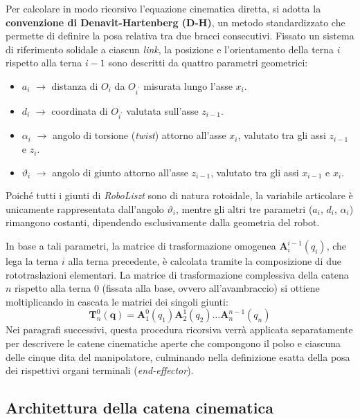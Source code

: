 Per calcolare in modo ricorsivo l'equazione cinematica diretta, si adotta la \textbf{convenzione di Denavit-Hartenberg (D-H)}, un metodo standardizzato che permette di definire la posa relativa tra due bracci consecutivi. 
Fissato un sistema di riferimento solidale a ciascun \textit{link}, la posizione e l'orientamento della terna $i$ rispetto alla terna $i-1$ sono descritti da quattro parametri geometrici:
\begin{itemize}
    \item $a_i$ $\to$ distanza di $O_i$ da $O_{i^\prime}$ misurata lungo l'asse $x_i$.
    \item $d_i$ $\to$ coordinata di $O_{i^\prime}$ valutata sull'asse $z_{i-1}$.
    \item $\alpha_i$ $\to$ angolo di torsione (\textit{twist}) attorno all'asse $x_i$, valutato tra gli assi $z_{i-1}$ e $z_i$.
    \item $\vartheta_i$ $\to$ angolo di giunto attorno all'asse $z_{i-1}$, valutato tra gli assi $x_{i-1}$ e $x_i$.
\end{itemize}
Poiché tutti i giunti di \textit{RoboLiszt} sono di natura rotoidale, la variabile articolare è unicamente rappresentata dall'angolo $\vartheta_i$, mentre gli altri tre parametri ($a_i$, $d_i$, $\alpha_i$) rimangono costanti, dipendendo esclusivamente dalla geometria del robot.

In base a tali parametri, la matrice di trasformazione omogenea $\boldsymbol{A}_{i}^{i-1}({q}_i)$, che lega la terna $i$ alla terna precedente, è calcolata tramite la composizione di due rototraslazioni elementari. 
La matrice di trasformazione complessiva della catena $n$ rispetto alla terna $0$ (fissata alla base, ovvero all'avambraccio) si ottiene moltiplicando in cascata le matrici dei singoli giunti:
\begin{equation}
    \boldsymbol{T}_n^0(\boldsymbol{q}) 
    = \boldsymbol{A}_1^0({q}_1) \boldsymbol{A}_2^1({q}_2) \dots \boldsymbol{A}_n^{n-1}({q}_n)
    \label{eq:open_kinematic_chain}
\end{equation}
Nei paragrafi successivi, questa procedura ricorsiva verrà applicata separatamente per descrivere le catene cinematiche aperte che compongono il polso e ciascuna delle cinque dita del manipolatore, culminando nella definizione esatta della posa dei rispettivi organi terminali (\textit{end-effector}).

\subsection{Architettura della catena cinematica}

